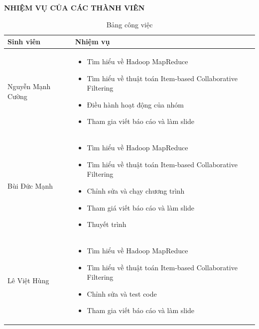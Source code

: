 \documentclass{report}
\begin{document}
\vfill
\LARGE \centering \textbf{NHIỆM VỤ CỦA CÁC THÀNH VIÊN}
\vspace{0.5cm}
\begin{table}[h!]
    \centering
    \hspace*{-1.2cm}
    \begin{tabular}{|l|p{10cm}|}
        \hline
        \textbf{Sinh viên} & \textbf{Nhiệm vụ}                         \\
        \hline
        Nguyễn Mạnh Cường  &
        \begin{itemize}
            \item Tìm hiểu về Hadoop MapReduce
            \item Tìm hiểu về thuật toán Item-based Collaborative Filtering
            \item Điều hành hoạt động của nhóm
            \item Tham gia viết báo cáo và làm slide
        \end{itemize} \\
        \hline
        Bùi Đức Mạnh       &
        \begin{itemize}
            \item Tìm hiểu về Hadoop MapReduce
            \item Tìm hiểu về thuật toán Item-based Collaborative Filtering
            \item Chỉnh sửa và chạy chương trình
            \item Tham giá viết báo cáo và làm slide
            \item Thuyết trình
        \end{itemize} \\
        \hline
        Lê Việt Hùng       &
        \begin{itemize}
            \item Tìm hiểu về Hadoop MapReduce
            \item Tìm hiểu về thuật toán Item-based Collaborative Filtering
            \item Chỉnh sửa và test code
            \item Tham gia viết báo cáo và làm slide
        \end{itemize} \\
        \hline
    \end{tabular}
    \caption{Bảng công việc}
    \label{tab:my_label}
\end{table}
\end{document}
